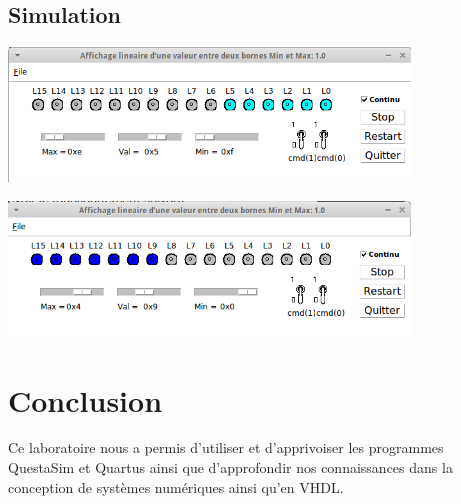 \subsection{Simulation}

\begin{minipage}{\textwidth}
	\center
	\includegraphics[width = 0.8\textwidth]{figures/mode_opt_depass_bas.png}
	\label{fig:8}
\end{minipage}

\begin{minipage}{\textwidth}
	\center
	\includegraphics[width = 0.8\textwidth]{figures/mode_opt_depass_haut.png}
	\label{fig:9}
\end{minipage}

\section{Conclusion}

Ce laboratoire nous a permis d'utiliser et d'apprivoiser les programmes QuestaSim et Quartus ainsi que d'approfondir nos connaissances dans la conception de systèmes numériques ainsi qu'en VHDL.



